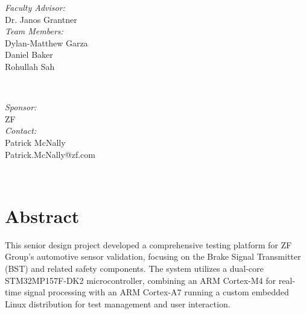\documentclass[12pt]{article}
\begin{document}
\begin{titlepage}

  \begin{minipage}{0.4\textwidth}
    \begin{flushleft} \large
      \emph{Faculty Advisor:}\\
      Dr. Janos Grantner\\ [.25cm]
      \emph{Team Members:}\\
      Dylan-Matthew Garza\\
      Daniel Baker\\
      Rohullah Sah
    \end{flushleft}
  \end{minipage}
  ~
  \begin{minipage}{0.4\textwidth}
    \begin{flushright} \large
      \emph{Sponsor:} \\
      ZF
      \\\emph{Contact:}\\
      Patrick McNally\\ 
      Patrick.McNally@zf.com
    \end{flushright}
  \end{minipage}\\[1cm]


  \begin{flushleft} \large
  \end{flushleft}

  \vfill 

\end{titlepage}

\tableofcontents
\newpage
\doublespacing
\section{Abstract}


This senior design project developed a comprehensive testing platform for ZF Group's 
automotive sensor validation, focusing on the Brake Signal Transmitter (BST) and 
related safety components. The system utilizes a dual-core STM32MP157F-DK2 
microcontroller, combining an ARM Cortex-M4 for real-time signal processing with 
an ARM Cortex-A7 running a custom embedded Linux distribution for test management 
and user interaction.
\end{document}
